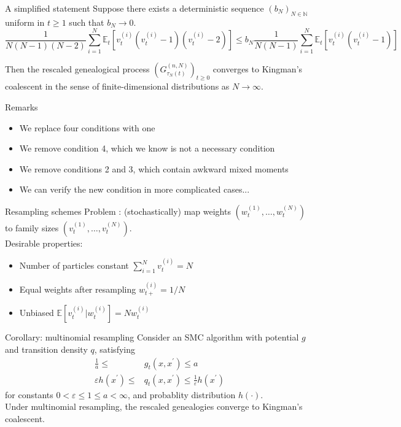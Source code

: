 \documentclass[aspectratio=169]{beamer}
\theoremstyle{definition}
\newcommand{\E}{\mathbb{E}}
\newcommand{\vt}[2][t]{v_{#1}^{(#2)}}
\newcommand{\wt}[2][t]{w_{#1}^{(#2)}}
\newcommand{\Et}{\mathbb{E}_{t}}
\begin{document}
\begin{frame}{A simplified statement}
\vspace{-10pt}
\pause
Suppose there exists a deterministic sequence $(b_N)_{N\in\mathbb{N}}$ uniform in $t\geq 1$ such that $b_N \to 0$.
\begin{equation*}
\frac{1}{N(N-1)(N-2)} \sum_{i = 1}^N \Et[ \vt{i}(\vt{i}-1)(\vt{i}-2) ]  \leq b_N \frac{1}{N(N-1)} \sum_{i = 1}^N \Et[ \vt{i}(\vt{i}-1)  ]
\end{equation*}

Then the rescaled genealogical process $(G_{\tau_N(t)}^{(n,N)})_{t\geq0} $ converges to Kingman's coalescent in the sense of finite-dimensional distributions as $N\to\infty$.
\end{frame}

\begin{frame}{Remarks}
\begin{itemize}
\item We replace four conditions with one
\pause
\item We remove condition 4, which we know is not a necessary condition
\pause
\item We remove conditions 2 and 3, which contain awkward mixed moments
\pause
\item We can verify the new condition in more complicated cases...
\end{itemize}
\end{frame}

\begin{frame}{Resampling schemes}
Problem : (stochastically) map weights $(\wt{1}, \dots, \wt{N})$ to family sizes $(\vt{1},\dots, \vt{N})$.\\

\pause
Desirable properties:
\begin{itemize}
\item Number of particles constant $\sum_{i=1}^N \vt{i} =N$
\item Equal weights after resampling $w_{t+}^{(i)} = 1/N$
\item Unbiased $\E[\vt{i} | \wt{i}] = N\wt{i}$
\end{itemize}
\end{frame}

\begin{frame}{Corollary: multinomial resampling}
Consider an SMC algorithm with potential $g$ and transition density $q$, satisfying
\begin{align*}
\frac{1}{a} \leq &g_t(x, x^\prime) \leq a \\
\varepsilon h(x^\prime) \leq &q_t(x, x^\prime) \leq \frac{1}{\varepsilon} h(x^\prime) 
\end{align*}
for constants $0<\varepsilon\leq 1\leq a<\infty$, and probablity distribution $h(\cdot)$.\\[10pt]

Under multinomial resampling, the rescaled genealogies converge to Kingman's coalescent.
\end{frame}
\end{document}

